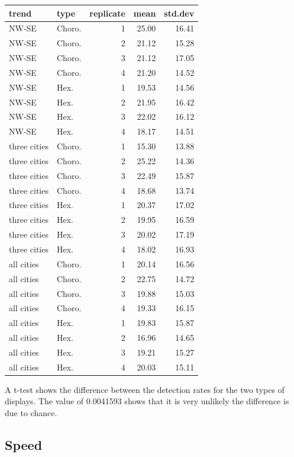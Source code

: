 \documentclass[conference,final,]{IEEEtran}
\begin{document}
\begin{tabular}{l|l|r|r|r}
\hline
trend & type & replicate & mean & std.dev\\
\hline
NW-SE & Choro. & 1 & 25.00 & 16.41\\
\hline
NW-SE & Choro. & 2 & 21.12 & 15.28\\
\hline
NW-SE & Choro. & 3 & 21.12 & 17.05\\
\hline
NW-SE & Choro. & 4 & 21.20 & 14.52\\
\hline
NW-SE & Hex. & 1 & 19.53 & 14.56\\
\hline
NW-SE & Hex. & 2 & 21.95 & 16.42\\
\hline
NW-SE & Hex. & 3 & 22.02 & 16.12\\
\hline
NW-SE & Hex. & 4 & 18.17 & 14.51\\
\hline
three cities & Choro. & 1 & 15.30 & 13.88\\
\hline
three cities & Choro. & 2 & 25.22 & 14.36\\
\hline
three cities & Choro. & 3 & 22.49 & 15.87\\
\hline
three cities & Choro. & 4 & 18.68 & 13.74\\
\hline
three cities & Hex. & 1 & 20.37 & 17.02\\
\hline
three cities & Hex. & 2 & 19.95 & 16.59\\
\hline
three cities & Hex. & 3 & 20.02 & 17.19\\
\hline
three cities & Hex. & 4 & 18.02 & 16.93\\
\hline
all cities & Choro. & 1 & 20.14 & 16.56\\
\hline
all cities & Choro. & 2 & 22.75 & 14.72\\
\hline
all cities & Choro. & 3 & 19.88 & 15.03\\
\hline
all cities & Choro. & 4 & 19.33 & 16.15\\
\hline
all cities & Hex. & 1 & 19.83 & 15.87\\
\hline
all cities & Hex. & 2 & 16.96 & 14.65\\
\hline
all cities & Hex. & 3 & 19.21 & 15.27\\
\hline
all cities & Hex. & 4 & 20.03 & 15.11\\
\hline
\end{tabular}

A t-test shows the difference between the detection rates for the two
types of displays. The value of 0.0041593 shows that it is very unlikely
the difference is due to chance.

\hypertarget{speed}{%
\subsection{Speed}\label{speed}}
\end{document}

